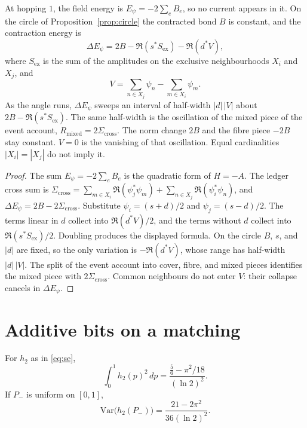 \begin{proposition}
\label{prop:circle-energy}
At hopping \(1\), the field energy is \(E_\psi=-2\sum_e B_e\), so no
current appears in it.
On the circle of Proposition~\ref{prop:circle} the contracted bond \(B\)
is constant, and the contraction energy is
\[
\Delta E_\psi
=2B-\Re(s^* S_{\mathrm{ex}})-\Re(d^* V),
\]
where \(S_{\mathrm{ex}}\) is the sum of the amplitudes on the exclusive
neighbourhoods \(X_i\) and \(X_j\), and
\[
V=\sum_{n\in X_j}\psi_n-\sum_{m\in X_i}\psi_m.
\]
As the angle runs, \(\Delta E_\psi\) sweeps an interval of half-width
\(|d|\,|V|\) about \(2B-\Re(s^* S_{\mathrm{ex}})\).
The same half-width is the oscillation of the mixed piece of the event
account, \(R_{\mathrm{mixed}}=2\Sigma_{\mathrm{cross}}\).
The norm change \(2B\) and the fibre piece \(-2B\) stay constant.
\(V=0\) is the vanishing of that oscillation.
Equal cardinalities \(|X_i|=|X_j|\) do not imply it.
\end{proposition}

\begin{proof}
The sum \(E_\psi=-2\sum_e B_e\) is the quadratic form of \(H=-A\).
The ledger cross sum is
\(\Sigma_{\mathrm{cross}}
=\sum_{m\in X_i}\Re(\psi_j^*\psi_m)
+\sum_{n\in X_j}\Re(\psi_i^*\psi_n)\),
and \(\Delta E_\psi=2B-2\Sigma_{\mathrm{cross}}\).
Substitute \(\psi_i=(s+d)/2\) and \(\psi_j=(s-d)/2\).
The terms linear in \(d\) collect into \(\Re(d^* V)/2\), and the terms
without \(d\) collect into \(\Re(s^* S_{\mathrm{ex}})/2\).
Doubling produces the displayed formula.
On the circle \(B\), \(s\), and \(|d|\) are fixed, so the only variation
is \(-\Re(d^* V)\), whose range has half-width \(|d|\,|V|\).
The split of the event account into cover, fibre, and mixed pieces
identifies the mixed piece with \(2\Sigma_{\mathrm{cross}}\).
Common neighbours do not enter \(V\): their collapse cancels in
\(\Delta E_\psi\).
\end{proof}

\section{Additive bits on a matching}
\label{sec:bits}

\begin{lemma}
\label{lem:varh}
For \(h_2\) as in \eqref{eq:se},
\[
\int_0^1 h_2(p)^2\,dp
=\frac{\tfrac56-\pi^2/18}{(\ln 2)^2}.
\]
If \(P_-\) is uniform on \([0,1]\),
\[
\mathrm{Var}\bigl(h_2(P_-)\bigr)
=\frac{21-2\pi^2}{36(\ln 2)^2}.
\]
\end{lemma}

